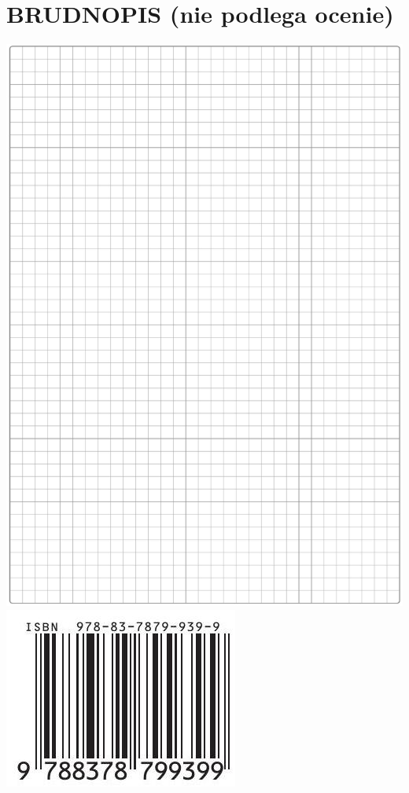 \documentclass[10pt]{article}
\begin{document}
\section*{BRUDNOPIS (nie podlega ocenie)}
\includegraphics[max width=\textwidth, center]{2024_11_21_599d917d55a506aace4bg-11}\\
\includegraphics[max width=\textwidth, center]{2024_11_21_599d917d55a506aace4bg-12}
\end{document}
